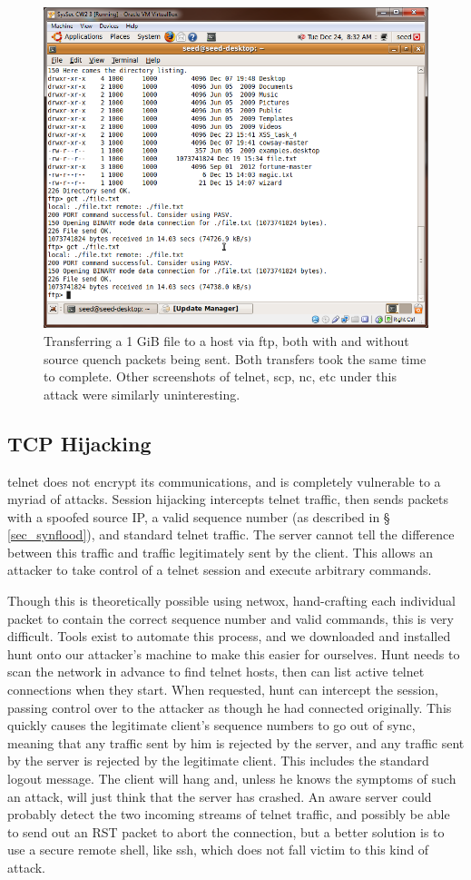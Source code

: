 \begin{figure}[h]
    \centering
    \includegraphics[width=.5\linewidth]{images/ftp_vs_sq.png}
    \caption{Transferring a 1 GiB file to a host via ftp, both with and without source quench packets being sent. Both
    transfers took the same time to complete. Other screenshots of telnet, scp, nc, etc under this attack were similarly
    uninteresting.}
    \label{fig:ftp_sq}
\end{figure}

\subsection{TCP Hijacking}

telnet does not encrypt its communications, and is completely vulnerable to a myriad of attacks. Session hijacking
intercepts telnet traffic, then sends packets with a spoofed source IP, a valid sequence number (as described in \S
\ref{sec_synflood}), and standard telnet traffic. The server cannot tell the difference between this traffic and traffic
legitimately sent by the client. This allows an attacker to take control of a telnet session and execute arbitrary
commands.

Though this is theoretically possible using netwox, hand-crafting each individual packet to contain the correct sequence
number and valid commands, this is very difficult. Tools exist to automate this process, and we downloaded and installed
hunt onto our attacker's machine to make this easier for ourselves. Hunt needs to scan the network in advance to find
telnet hosts, then can list active telnet connections when they start. When requested, hunt can intercept the session,
passing control over to the attacker as though he had connected originally. This quickly causes the legitimate client's
sequence numbers to go out of sync, meaning that any traffic sent by him is rejected by the server, and any traffic sent
by the server is rejected by the legitimate client. This includes the standard logout message. The client will hang and,
unless he knows the symptoms of such an attack, will just think that the server has crashed. An aware server could
probably detect the two incoming streams of telnet traffic, and possibly be able to send out an RST packet to abort the
connection, but a better solution is to use a secure remote shell, like ssh, which does not fall victim to this kind of
attack.

